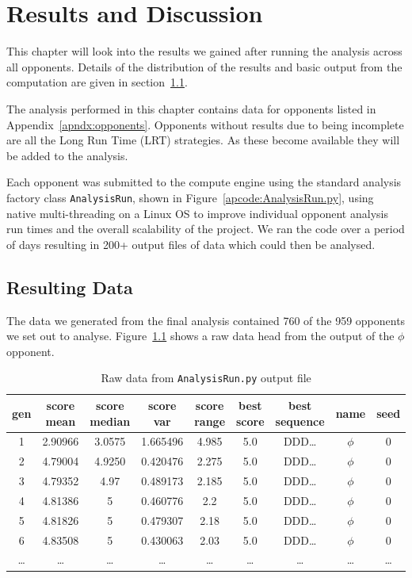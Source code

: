 \chapter{Results and Discussion}\label{ch:results}
This chapter will look into the results we gained after running the analysis across all opponents.
Details of the distribution of the results and basic output from the computation are given in section~\ref{sec:descriptive_data}.

The analysis performed in this chapter contains data for opponents listed in Appendix~\ref{apndx:opponents}.
Opponents without results due to being incomplete are all the Long Run Time (LRT) strategies.
As these become available they will be added to the analysis.

Each opponent was submitted to the compute engine using the standard analysis factory class \texttt{AnalysisRun}, shown in Figure~\ref{apcode:AnalysisRun.py}, using native multi-threading on a Linux OS to improve individual opponent analysis run times and the overall scalability of the project.
We ran the code over a period of days resulting in 200+ output files of data which could then be analysed.

\section{Resulting Data}\label{sec:descriptive_data}
The data we generated from the final analysis contained 760 of the 959 opponents we set out to analyse.
Figure~\ref{table:data_dump} shows a raw data head from the output of the $\phi$ opponent.

\begin{table}[ht]
    \centering
    \begin{tabular}{ccccccccc}
        \toprule
        gen & score mean & score median & score var & score range & best score & best sequence &  name & seed \\
        \midrule
        1 & 2.90966 & 3.0575 & 1.665496 & 4.985 & 5.0 & DDD\ldots & $\phi$ & 0 \\
        2 & 4.79004 & 4.9250 & 0.420476 & 2.275 & 5.0 & DDD\ldots & $\phi$ & 0\\
        3 & 4.79352 & 4.97 & 0.489173 & 2.185 & 5.0 & DDD\ldots & $\phi$ & 0\\
        4 & 4.81386 & 5 & 0.460776 & 2.2 & 5.0 & DDD\ldots & $\phi$ & 0\\
        5 & 4.81826 & 5 & 0.479307 & 2.18 & 5.0 & DDD\ldots & $\phi$ & 0\\
        6 & 4.83508 & 5 & 0.430063 & 2.03 & 5.0 & DDD\ldots & $\phi$ & 0\\
        \ldots & \ldots & \ldots & \ldots & \ldots & \ldots & \ldots & \ldots & \ldots\\        
        \bottomrule
    \end{tabular}
    \caption{Raw data from \texttt{AnalysisRun.py} output file}\label{table:data_dump}
\end{table}


